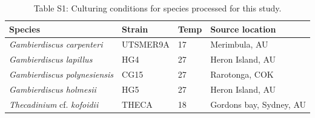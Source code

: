 \documentclass[fleqn,10pt,lineno]{wlpeerj} %
\begin{document}
\begin{table}
\caption*{Table S1: Culturing conditions for species processed for this study.}
\begin{tabular}{ | p{3cm} | p{2.5cm} | p{1.5cm} | p{5.3cm} |}
\hline
\textbf{Species} & \textbf{Strain}& \textbf{Temp} & \textbf{Source location} \\
\hline
\textit{Gambierdiscus carpenteri}&UTSMER9A&17&Merimbula, AU\\
\hline
\textit{Gambierdiscus lapillus}&HG4&27&Heron Island, AU\\
\hline
\textit{Gambierdiscus polynesiensis}&CG15&27&Rarotonga, COK\\
\hline
\emph{Gambierdiscus holmesii}&HG5&27&Heron Island, AU\\
\hline
\textit{Thecadinium} cf. \emph{kofoidii}&THECA&18&Gordons bay, Sydney, AU\\
\hline
\end{tabular}
\end{table}
\end{document}
